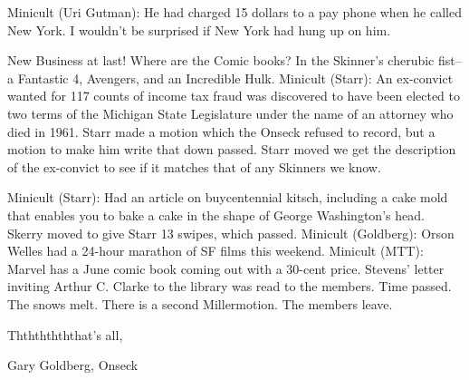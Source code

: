 \documentclass[12pt]{article}
\begin{document}
Minicult (Uri Gutman): He had charged 15 dollars to a pay phone when he called New York. I wouldn't be surprised if New York had hung up on him.

New Business at last! Where are the Comic books? In the Skinner's cherubic fist--a Fantastic 4, Avengers, and an Incredible Hulk. Minicult (Starr): An ex-convict wanted for 117 counts of income tax fraud was discovered to have been elected to two terms of the Michigan State Legislature under the name of an attorney who died in 1961. Starr made a motion which the Onseck refused to record, but a motion to make him write that down passed. Starr moved we get the description of the ex-convict to see if it matches that of any Skinners we know.

Minicult (Starr): Had an article on buycentennial kitsch, including a cake mold that enables you to bake a cake in the shape of George Washington's head. Skerry moved to give Starr 13 swipes, which passed. Minicult (Goldberg): Orson Welles had a 24-hour marathon of SF films this weekend. Minicult (MTT): Marvel has a June comic book coming out with a 30-cent price. Stevens' letter inviting Arthur C. Clarke to the library was read to the members. Time passed. The snows melt. There is a second Millermotion. The members leave.

\vspace{12pt}

\centerline{Ththththththat's all,}
\centerline{Gary Goldberg, Onseck}
\end{document}
